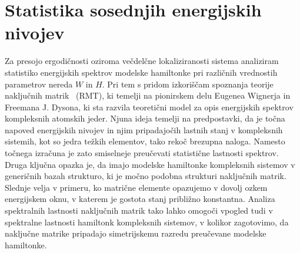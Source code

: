 \documentclass[10pt,a4paper]{article}
\begin{document}
\section{Statistika sosednjih energijskih nivojev}
Za presojo ergodičnosti oziroma večdelčne lokaliziranosti sistema analiziram statistiko energijskih spektrov modelske hamiltonke pri različnih vrednostih parametrov nereda $W$ in $H$. Pri tem s pridom izkoriščam spoznanja teorije naključnih matrik~\cite{mehta2004random} (RMT), ki temelji na pionirskem delu Eugenea Wignerja in Freemana J. Dysona, ki sta razvila teoretični model za opis energijskih spektrov kompleksnih atomskih jeder. Njuna ideja temelji na predpostavki, da je točna napoved energijskih nivojev in njim pripadajočih lastnih stanj v kompleksnih sistemih, kot so jedra težkih elementov, tako rekoč brezupna naloga. Namesto točnega izračuna je zato smiselneje preučevati statistične lastnosti spektrov. Druga ključna opazka je, da imajo modelske hamiltonke kompleksnih sistemov v generičnih bazah strukturo, ki je močno podobna strukturi naključnih matrik. Slednje velja v primeru, ko matrične elemente opazujemo v dovolj ozkem energijskem oknu, v katerem je gostota stanj približno konstantna. Analiza spektralnih lastnosti naključnih matrik tako lahko omogoči vpogled tudi v spektralne lastnosti hamiltonk kompleksnih sistemov, v kolikor zagotovimo, da naključne matrike pripadajo simetrijskemu razredu preučevane modelske hamiltonke. \\
\end{document}
